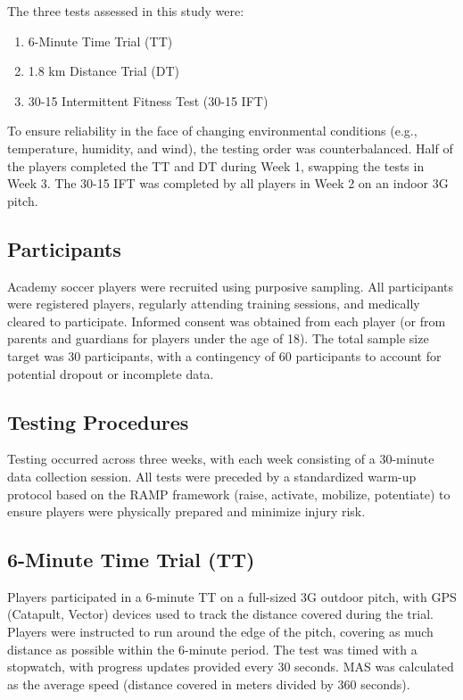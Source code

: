\documentclass[
  man]{apa6}
\begin{document}
The three tests assessed in this study were:

\begin{enumerate}
\def\labelenumi{\arabic{enumi}.}
\item
  6-Minute Time Trial (TT)
\item
  1.8 km Distance Trial (DT)
\item
  30-15 Intermittent Fitness Test (30-15 IFT)
\end{enumerate}

To ensure reliability in the face of changing environmental conditions (e.g., temperature, humidity, and wind), the testing order was counterbalanced. Half of the players completed the TT and DT during Week 1, swapping the tests in Week 3. The 30-15 IFT was completed by all players in Week 2 on an indoor 3G pitch.

\subsection{Participants}\label{participants}

Academy soccer players were recruited using purposive sampling. All participants were registered players, regularly attending training sessions, and medically cleared to participate. Informed consent was obtained from each player (or from parents and guardians for players under the age of 18). The total sample size target was 30 participants, with a contingency of 60 participants to account for potential dropout or incomplete data.

\subsection{Testing Procedures}\label{testing-procedures}

Testing occurred across three weeks, with each week consisting of a 30-minute data collection session. All tests were preceded by a standardized warm-up protocol based on the RAMP framework (raise, activate, mobilize, potentiate) to ensure players were physically prepared and minimize injury risk.

\subsection{6-Minute Time Trial (TT)}\label{minute-time-trial-tt}

Players participated in a 6-minute TT on a full-sized 3G outdoor pitch, with GPS (Catapult, Vector) devices used to track the distance covered during the trial. Players were instructed to run around the edge of the pitch, covering as much distance as possible within the 6-minute period. The test was timed with a stopwatch, with progress updates provided every 30 seconds. MAS was calculated as the average speed (distance covered in meters divided by 360 seconds).
\end{document}
